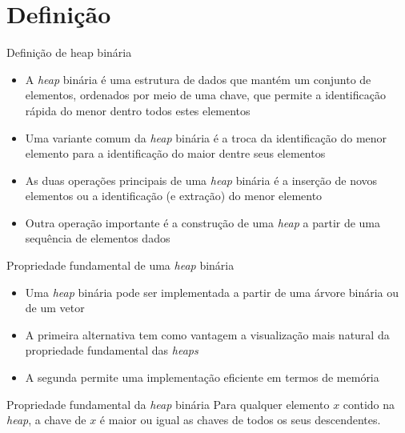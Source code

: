 \section{Definição}

\begin{frame}[fragile]{Definição de heap binária}

    \begin{itemize}
        \item A \textit{heap} binária é uma estrutura de dados que mantém um conjunto de elementos,
            ordenados por meio de uma chave, que permite a identificação rápida do menor
            dentro todos estes elementos

        \item Uma variante comum da \textit{heap} binária é a troca da identificação do menor
            elemento para a identificação do maior dentre seus elementos

        \item As duas operações principais de uma \textit{heap} binária é a inserção de novos
            elementos ou a identificação (e extração) do menor elemento

        \item Outra operação importante é a construção de uma
            \textit{heap} a partir de uma sequência de elementos dados
    \end{itemize}

\end{frame}

\begin{frame}[fragile]{Propriedade fundamental de uma \textit{heap} binária}

    \begin{itemize}
        \item Uma \textit{heap} binária pode ser implementada a partir de uma árvore binária
            ou de um vetor

        \item A primeira alternativa tem como vantagem a visualização mais natural da 
            propriedade fundamental das \textit{heaps}

        \item A segunda permite uma implementação eficiente em termos de memória
    \end{itemize}

    \begin{block}{Propriedade fundamental da \textit{heap} binária}
        Para qualquer elemento $x$ contido na \textit{heap}, a chave de $x$ é maior ou igual as
        chaves de todos os seus descendentes.
    \end{block}
	
\end{frame}


